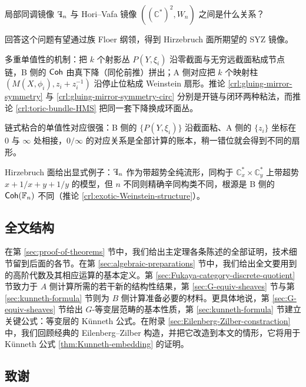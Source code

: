 \begin{ques}\label{Q:HV-vs-LHMS}
    局部同调镜像 $\rF_n$ 与 Hori--Vafa 镜像 $\left((\mathbb{C}^{\ast})^2,W_n\right)$ 之间是什么关系？
\end{ques}

回答这个问题有望通过族 Floer 纲领，得到 Hirzebruch 面所期望的 SYZ 镜像。

\begin{keytakeaways}
  \item 多重单值性的机制：把 $k$ 个射影丛 $P(Y,\xi_i)$ 沿零截面与无穷远截面粘成节点链，B 侧的 $\operatorname{\mathsf{Coh}}$ 由真下降（同伦前推）拼出；A 侧对应把 $k$ 个映射柱 $(M(X,\phi_i),z_i+z_i^{-1})$ 沿停止位粘成 Weinstein 扇形。推论 \ref{crl:gluing-mirror-symmetry} 与 \ref{crl:gluing-mirror-symmetry-circ} 分别是开链与闭环两种粘法，而推论 \ref{crl:toric-bundle-HMS} 把同一套下降换成环面丛。
  \item 链式粘合的单值性对应很强：B 侧的 $\{P(Y,\xi_i)\}$ 沿截面粘、A 侧的 $\{z_i\}$ 坐标在 $0$ 与 $\infty$ 处相接，$0/\infty$ 的对应关系是全部计算的账本，稍一错位就会得到不同的扇形。
  \item Hirzebruch 面给出显式例子：$\rF_n$ 作为带超势全纯流形，同构于 $\mathbb{C}^{\ast}_x\times\mathbb{C}^{\ast}_y$ 上带超势 $x+1/x+y+1/y$ 的模型，但 $n$ 不同则精确辛同构类不同，根源是 B 侧的 $\operatorname{\mathsf{Coh}} (\mathbb{F}_n)$ 不同（推论 \ref{crl:exotic-Weinstein-structure}）。
\end{keytakeaways}

\subsection{全文结构}

在第 \ref{sec:proof-of-theorems} 节中，我们给出主定理各条陈述的全部证明，技术细节留到后面的各节。在第 \ref{sec:algebraic-preparations} 节中，我们给出全文要用到的高阶代数及其相应运算的基本定义。第 \ref{sec:Fukaya-category-discrete-quotient} 节致力于 $A$ 侧计算所需的若干新的结构性结果，第 \ref{sec:G-equiv-sheaves} 节与第 \ref{sec:kunneth-formula} 节则为 $B$ 侧计算准备必要的材料。更具体地说，第 \ref{sec:G-equiv-sheaves} 节给出 $G$-等变层范畴的基本性质，第 \ref{sec:kunneth-formula} 节建立关键公式：等变层的 K\"unneth 公式。在附录 \ref{sec:Eilenberg-Zilber-constraction} 中，我们回顾经典的 Eilenberg--Zilber 构造，并把它改造到本文的情形，它将用于 Künneth 公式 \ref{thm:Kunneth-embedding} 的证明。

\subsection*{致谢}

